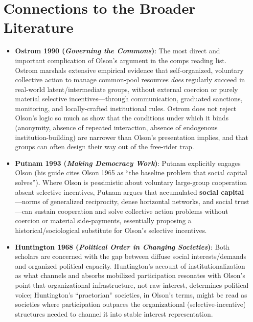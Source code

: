 \documentclass[12pt]{article}
\begin{document}
\section{Connections to the Broader Literature}

\begin{itemize}[leftmargin=*, itemsep=4pt]
    \item \textbf{Ostrom 1990 (\textit{Governing the Commons})}: The most direct and important complication of Olson's argument in the comps reading list. Ostrom marshals extensive empirical evidence that self-organized, voluntary collective action to manage common-pool resources \emph{does} regularly succeed in real-world latent/intermediate groups, without external coercion or purely material selective incentives---through communication, graduated sanctions, monitoring, and locally-crafted institutional rules. Ostrom does not reject Olson's logic so much as show that the conditions under which it binds (anonymity, absence of repeated interaction, absence of endogenous institution-building) are narrower than Olson's presentation implies, and that groups can often design their way out of the free-rider trap.
    \item \textbf{Putnam 1993 (\textit{Making Democracy Work})}: Putnam explicitly engages Olson (his guide cites Olson 1965 as ``the baseline problem that social capital solves''). Where Olson is pessimistic about voluntary large-group cooperation absent selective incentives, Putnam argues that accumulated \textbf{social capital}---norms of generalized reciprocity, dense horizontal networks, and social trust---can sustain cooperation and solve collective action problems without coercion or material side-payments, essentially proposing a historical/sociological substitute for Olson's selective incentives.
    \item \textbf{Huntington 1968 (\textit{Political Order in Changing Societies})}: Both scholars are concerned with the gap between diffuse social interests/demands and organized political capacity. Huntington's account of institutionalization as what channels and absorbs mobilized participation resonates with Olson's point that organizational infrastructure, not raw interest, determines political voice; Huntington's ``praetorian'' societies, in Olson's terms, might be read as societies where participation outpaces the organizational (selective-incentive) structures needed to channel it into stable interest representation.

\end{itemize}
\end{document}
